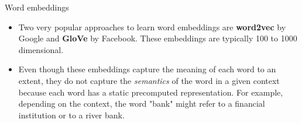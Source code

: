 \begin{vbframe} {Word embeddings}
\begin{itemize}
    \item Two very popular approaches to learn  word embeddings are \textbf{word2vec} by Google and \textbf{GloVe} by Facebook. These embeddings are typically 100 to 1000 dimensional.
    \item Even though these embeddings capture the meaning of each word to an extent, they do not capture the \textit{semantics} of the word in a given context because each word has a static precomputed representation. For example, depending on the context, the word "bank" might refer to a financial institution or to a river bank.
  \end{itemize}
\end{vbframe}


% 
% 



